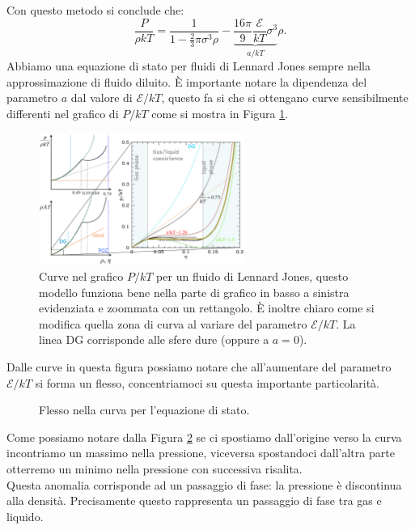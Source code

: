 Con questo metodo si conclude che:
\[
	\frac{P}{\rho kT} 
	=
	\frac{1}{1- \frac{2}{3}\pi\sigma^3\rho }
	-
\underbrace{
	\frac{16\pi}{9}\frac{\mathcal{E}}{kT}\sigma^3
}_{a/kT}	
	\rho 
.\] 
Abbiamo una equazione di stato per fluidi di Lennard Jones sempre nella approssimazione di fluido diluito. È importante notare la dipendenza del parametro $a$ dal valore di $\mathcal{E} /kT$, questo fa si che si ottengano curve sensibilmente differenti nel grafico di $P/kT$ come si mostra in Figura \ref{fig:-figures-Wan-Der-Waals-curve-dipendenza-ekT-png}.
\begin{figure}[H]
	\centering
	\includegraphics[width=0.6\textwidth]{figures/Wan-Der-Waals-curve--dipendenza-ekT.png}
	\caption{\scriptsize Curve nel grafico $P/kT$ per un fluido di Lennard Jones,
	questo modello funziona bene nella parte di grafico in basso a sinistra 
	evidenziata e zoommata con un rettangolo. È inoltre chiaro come si modifica quella
	zona di curva al variare del parametro $\mathcal{E} /kT$. La linea DG corrisponde 
	alle sfere dure (oppure a $a=0$).}
	\label{fig:-figures-Wan-Der-Waals-curve-dipendenza-ekT-png}
\end{figure}
Dalle curve in questa figura possiamo notare che all'aumentare del parametro $\mathcal{E} /kT$ si forma un flesso, concentriamoci su questa importante particolarità. \\
\begin{figure}[H]
    \centering
    \caption{Flesso nella curva per l'equazione di stato.}
    \label{fig:cambio-statoWDV}
\end{figure}
\noindent
Come possiamo notare dalla Figura \ref{fig:cambio-statoWDV} se ci spostiamo dall'origine verso la curva incontriamo un massimo nella pressione, viceversa spostandoci dall'altra parte otterremo un minimo nella pressione con successiva risalita. \\
Questa anomalia corrisponde ad un passaggio di fase: la pressione è discontinua alla densità. Precisamente questo rappresenta un passaggio di fase tra gas e liquido.
